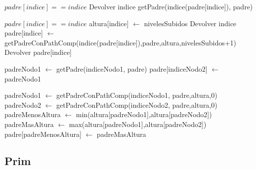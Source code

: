 \documentclass[11pt,a4paper]{article}
\begin{document}
\begin{codebox}
\li \If $padre[indice] == indice$ \Then
		\li Devolver indice
\li \Else
		\li getPadre(indice(padre[indice]), padre)
\li \End
\end{codebox}


\begin{codebox}
\li \If $padre[indice] == indice$ \Then
		\li altura[indice] $\gets$ nivelesSubidos
		\li Devolver indice
	\li \Else
		\li padre[indice] $\gets$ getPadreConPathComp(indice(padre[indice]),padre,altura,nivelesSubidos+1)
		\li Devolver padre[indice]
		\End
\end{codebox}

\begin{codebox}
	\li padreNodo1 $\gets$ getPadre(indiceNodo1, padre)
	\li padre[indiceNodo2] $\gets$ padreNodo1
\end{codebox}

\begin{codebox}
\li padreNodo1 $\gets$ getPadreConPathComp(indiceNodo1, padre,altura,0)
\li padreNodo2 $\gets$ getPadreConPathComp(indiceNodo2, padre,altura,0)
\li padreMenosAltura $\gets$ min(altura[padreNodo1],altura[padreNodo2])
\li padreMasAltura $\gets$ max(altura[padreNodo1],altura[padreNodo2])
\li padre[padreMenosAltura] $\gets$ padreMasAltura
\end{codebox}

\subsection{Prim}

\end{document}
